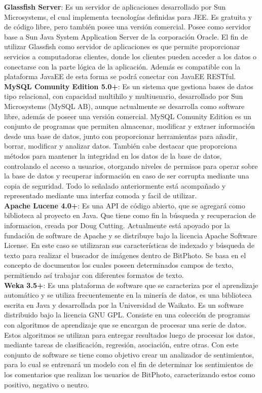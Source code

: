 \documentclass{memoria}
\begin{document}
\textbf{Glassfish Server}: Es un servidor de aplicaciones desarrollado por Sun Microsystems, el cual implementa tecnologías definidas para JEE. Es gratuita y de código libre, pero también posee una versión comercial. Posee como servidor base a Sun Java System Application Server de la corporación Oracle. El fin de utilizar Glassfish como servidor de aplicaciones es que permite proporcionar servicios a computadoras clientes, donde los clientes pueden acceder a los datos o conectarse con la parte lógica de la aplicación. Además es compatible con la plataforma JavaEE de esta forma se podrá conectar con JavaEE RESTful.\\

\textbf{MySQL Comunity Edition 5.0+}: Es un sistema que gestiona bases de datos tipo relacional, con capacidad multihilo y multiusuario, desarrollado por Sun Microsystems (MySQL AB), aunque actualmente se desarrolla como software libre, además de poseer una versión comercial. MySQL Comunity Edition es un conjunto de programas que permiten almacenar, modificar y extraer información desde una base de datos, junto con proporcionar herramientas para añadir, borrar, modificar y analizar datos. También cabe destacar que proporciona métodos para mantener la integridad en los datos de la base de datos, controlando el acceso a usuarios, otorgando niveles de permisos para operar sobre la base de datos y recuperar información en caso de ser corrupta mediante una copia de seguridad. Todo lo señalado anteriormente está acompañado y representado mediante una interfaz comoda y facil de utilizar.\\

\textbf{Apache Lucene 4.0+}: Es una API de código abierto, que se agregará como biblioteca al proyecto en Java. Que tiene como fin la búsqueda y recuperacion de informacion, creada por Doug Cutting. Actualmente está apoyado por la fundación de software de Apache y se distribuye bajo la licencia Apache Software License. En este caso se utilizaran sus características de indexado y búsqueda de texto para realizar el buscador de imágenes dentro de BitPhoto. Se basa en el concepto de documentos los cuales poseen determinados campos de texto, permitiendo así trabajar con diferentes formatos de texto.\\

\textbf{Weka 3.5+}: Es una plataforma de software que se caracteriza por el aprendizaje automático y se utiliza frecuentemente en la minería de datos, es una biblioteca escrita en Java y desarrollada por la Universidad de Waikato. Es un software distribuido bajo la licencia GNU GPL. Consiste en una colección de programas con algoritmos de aprendizaje que se encargan de procesar una serie de datos. Estos algoritmos se utilizan para entregar resultados luego de procesar los datos, mediante tareas de clasificación, regresión, asociación, entre otras. Con este conjunto de software se tiene como objetivo crear un analizador de sentimientos, para lo cual se entrenará un modelo con el fin de determinar los sentimientos de los comentarios que realizan los usuarios de BitPhoto, caracterizando estos como positivo, negativo o neutro.\\
\end{document}
